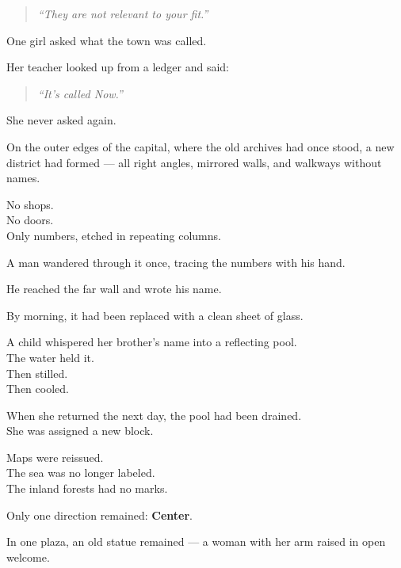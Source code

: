 \documentclass[12pt]{article}
\begin{document}
\begin{quote}
\textit{“They are not relevant to your fit.”}
\end{quote}

\vspace{1em}

One girl asked what the town was called.

Her teacher looked up from a ledger and said:

\begin{quote}
\textit{“It’s called Now.”}
\end{quote}

She never asked again.

\vspace{1em}

On the outer edges of the capital, where the old archives had once stood, a new district had formed — all right angles, mirrored walls, and walkways without names.

No shops.\\
No doors.\\
Only numbers, etched in repeating columns.

A man wandered through it once, tracing the numbers with his hand.

He reached the far wall and wrote his name.

By morning, it had been replaced with a clean sheet of glass.

\vspace{1em}

A child whispered her brother’s name into a reflecting pool.\\
The water held it.\\
Then stilled.\\
Then cooled.

When she returned the next day, the pool had been drained.\\
She was assigned a new block.

\vspace{1em}

Maps were reissued.\\
The sea was no longer labeled.\\
The inland forests had no marks.

Only one direction remained: \textbf{Center}.

\vspace{1em}

In one plaza, an old statue remained — a woman with her arm raised in open welcome.
\end{document}
